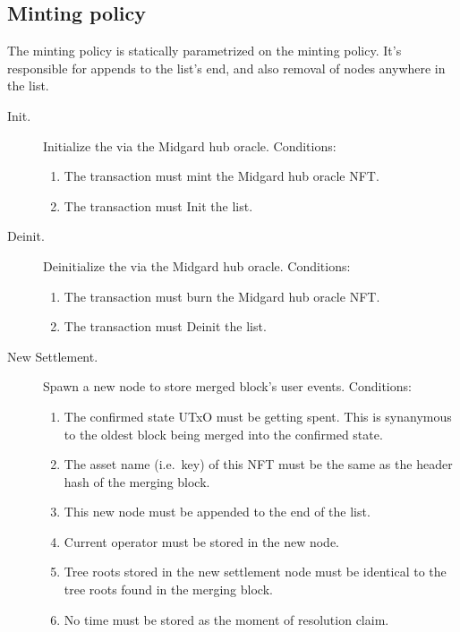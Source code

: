 \documentclass[../midgard.tex]{subfiles}
\begin{document}
\subsection{Minting policy}
\label{h:settlement-queue-minting-policy}

The  minting policy is statically parametrized on the  minting policy. It's responsible for appends to the  list's end, and also removal of nodes anywhere in the list.
\begin{description}
    \item[Init.] Initialize the  via the Midgard hub oracle.
      Conditions:
        \begin{enumerate}
            \item The transaction must mint the Midgard hub oracle NFT.
            \item The transaction must Init the  list.
        \end{enumerate}
    \item[Deinit.] Deinitialize the  via the Midgard hub oracle.
      Conditions:
        \begin{enumerate}
            \item The transaction must burn the Midgard hub oracle NFT.
            \item The transaction must Deinit the  list.
        \end{enumerate}
    \item[New Settlement.] Spawn a new node to store merged block's user events.
      Conditions:
        \begin{enumerate}
            \item The confirmed state UTxO must be getting spent. This is synanymous to the oldest block being merged into the confirmed state.
            \item The asset name (i.e.\ key) of this NFT must be the same as the header hash of the merging block.
            \item This new node must be appended to the end of the  list.
            \item Current operator must be stored in the new node.
            \item Tree roots stored in the new settlement node must be identical to the tree roots found in the merging block.
            \item No time must be stored as the moment of resolution claim.

\end{enumerate}
\end{description}
\end{document}
